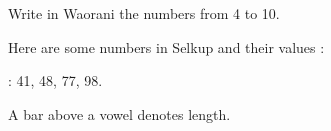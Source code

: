 \begin{refsection}
\begin{problem}{\langnameWaorani}{\nameDRadev}{}
\begin{assgts}
\item Write in Waorani the numbers from 4 to 10.
\end{assgts}
\end{problem}

\pagebreak
\begin{problem}{\langnameSelkup}{\nameSBurlak}{}
Here are some numbers in Selkup and their values \OlympiadRandomOrder{}: 

\begin{exe}
\end{exe}

\begin{assgts}
\item \detcorr
\item \taskWriteIn{\langnameSelkup}: 41, 48, 77, 98.
\end{assgts}

\begin{tblsWarning}
A bar above a vowel denotes length.
\end{tblsWarning}
\end{problem}


\end{refsection}
